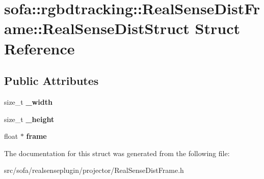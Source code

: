\hypertarget{structsofa_1_1rgbdtracking_1_1_real_sense_dist_frame_1_1_real_sense_dist_struct}{}\section{sofa\+:\+:rgbdtracking\+:\+:Real\+Sense\+Dist\+Frame\+:\+:Real\+Sense\+Dist\+Struct Struct Reference}
\label{structsofa_1_1rgbdtracking_1_1_real_sense_dist_frame_1_1_real_sense_dist_struct}
\subsection*{Public Attributes}
\begin{DoxyCompactItemize}
\item 
\mbox{\label{structsofa_1_1rgbdtracking_1_1_real_sense_dist_frame_1_1_real_sense_dist_struct_a9aebe63c9f0144dbc95337cc09c2266f}} 
size\+\_\+t {\bfseries \+\_\+width}
\item 
\mbox{\label{structsofa_1_1rgbdtracking_1_1_real_sense_dist_frame_1_1_real_sense_dist_struct_a7f08a343322668464a50912a970e1246}} 
size\+\_\+t {\bfseries \+\_\+height}
\item 
\mbox{\label{structsofa_1_1rgbdtracking_1_1_real_sense_dist_frame_1_1_real_sense_dist_struct_a8223b01562f5990926d5ebe4f449e5b6}} 
float $\ast$ {\bfseries frame}
\end{DoxyCompactItemize}


The documentation for this struct was generated from the following file\+:\begin{DoxyCompactItemize}
\item 
src/sofa/realsenseplugin/projector/Real\+Sense\+Dist\+Frame.\+h\end{DoxyCompactItemize}
